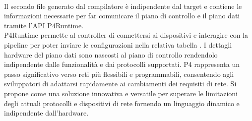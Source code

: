 \\Il secondo file generato dal compilatore è indipendente dal target e 
contiene le informazioni necessarie per far comunicare il piano di controllo e il piano dati tramite l'API P4Runtime.
\\P4Runtime permette al controller di connettersi ai dispositivi e interagire con la pipeline 
per poter inviare le configurazioni nella relativa tabella \cite{p4Article}. 
I dettagli hardware del piano dati sono nascosti al piano di controllo rendendolo indipendente dalle funzionalità e dai protocolli supportati.
P4 rappresenta un passo significativo verso reti più flessibili e programmabili, consentendo agli sviluppatori di adattarsi rapidamente ai cambiamenti dei requisiti di rete.
Si propone come una soluzione innovativa e versatile per superare le limitazioni degli attuali protocolli e dispositivi di rete fornendo un linguaggio dinamico e indipendente dall'hardware.

